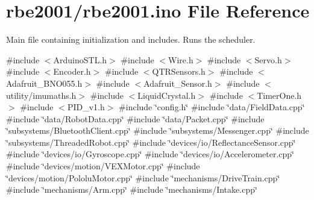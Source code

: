 \hypertarget{rbe2001_8ino}{}\section{rbe2001/rbe2001.ino File Reference}
\label{rbe2001_8ino}


Main file containing initialization and includes. Runs the scheduler.  


{\ttfamily \#include $<$Arduino\+S\+T\+L.\+h$>$}\newline
{\ttfamily \#include $<$Wire.\+h$>$}\newline
{\ttfamily \#include $<$Servo.\+h$>$}\newline
{\ttfamily \#include $<$Encoder.\+h$>$}\newline
{\ttfamily \#include $<$Q\+T\+R\+Sensors.\+h$>$}\newline
{\ttfamily \#include $<$Adafruit\+\_\+\+B\+N\+O055.\+h$>$}\newline
{\ttfamily \#include $<$Adafruit\+\_\+\+Sensor.\+h$>$}\newline
{\ttfamily \#include $<$utility/imumaths.\+h$>$}\newline
{\ttfamily \#include $<$Liquid\+Crystal.\+h$>$}\newline
{\ttfamily \#include $<$Timer\+One.\+h$>$}\newline
{\ttfamily \#include $<$P\+I\+D\+\_\+v1.\+h$>$}\newline
{\ttfamily \#include \char`\"{}config.\+h\char`\"{}}\newline
{\ttfamily \#include \char`\"{}data/\+Field\+Data.\+cpp\char`\"{}}\newline
{\ttfamily \#include \char`\"{}data/\+Robot\+Data.\+cpp\char`\"{}}\newline
{\ttfamily \#include \char`\"{}data/\+Packet.\+cpp\char`\"{}}\newline
{\ttfamily \#include \char`\"{}subsystems/\+Bluetooth\+Client.\+cpp\char`\"{}}\newline
{\ttfamily \#include \char`\"{}subsystems/\+Messenger.\+cpp\char`\"{}}\newline
{\ttfamily \#include \char`\"{}subsystems/\+Threaded\+Robot.\+cpp\char`\"{}}\newline
{\ttfamily \#include \char`\"{}devices/io/\+Reflectance\+Sensor.\+cpp\char`\"{}}\newline
{\ttfamily \#include \char`\"{}devices/io/\+Gyroscope.\+cpp\char`\"{}}\newline
{\ttfamily \#include \char`\"{}devices/io/\+Accelerometer.\+cpp\char`\"{}}\newline
{\ttfamily \#include \char`\"{}devices/motion/\+V\+E\+X\+Motor.\+cpp\char`\"{}}\newline
{\ttfamily \#include \char`\"{}devices/motion/\+Pololu\+Motor.\+cpp\char`\"{}}\newline
{\ttfamily \#include \char`\"{}mechanisms/\+Drive\+Train.\+cpp\char`\"{}}\newline
{\ttfamily \#include \char`\"{}mechanisms/\+Arm.\+cpp\char`\"{}}\newline
{\ttfamily \#include \char`\"{}mechanisms/\+Intake.\+cpp\char`\"{}}\newline

